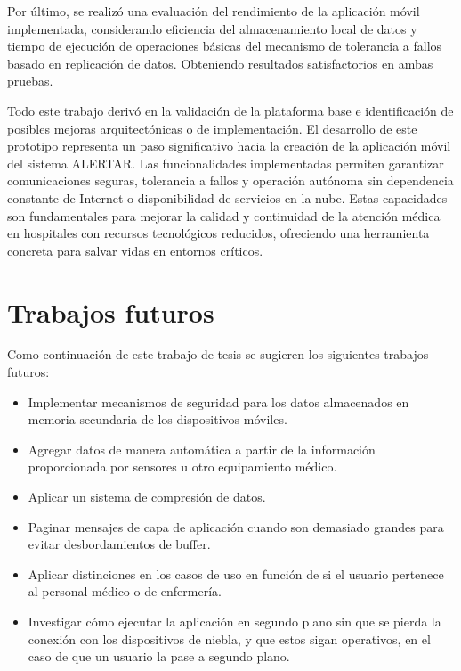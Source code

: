 Por último, se realizó una evaluación del rendimiento de la aplicación móvil implementada, considerando eficiencia del almacenamiento local de datos y tiempo de ejecución de operaciones básicas del mecanismo de tolerancia a fallos basado en replicación de datos. Obteniendo resultados satisfactorios en ambas pruebas. 



Todo este trabajo derivó en la validación de la plataforma base e identificación de posibles mejoras arquitectónicas o de implementación. El desarrollo de este prototipo representa un paso significativo hacia la creación de la aplicación móvil del sistema ALERTAR. Las funcionalidades implementadas permiten garantizar comunicaciones seguras, tolerancia a fallos y operación autónoma sin dependencia constante de Internet o disponibilidad de servicios en la nube. Estas capacidades son fundamentales para mejorar la calidad y continuidad de la atención médica en hospitales con recursos tecnológicos reducidos, ofreciendo una herramienta concreta para salvar vidas en entornos críticos.
\section{Trabajos futuros}

Como continuación de este trabajo de tesis se sugieren los siguientes trabajos futuros:
\begin{itemize}
    \item Implementar mecanismos de seguridad para los datos almacenados en memoria secundaria de los dispositivos móviles.
    \item Agregar datos de manera automática a partir de la información proporcionada por sensores u otro equipamiento médico.
    \item Aplicar un sistema de compresión de datos.
    \item Paginar mensajes de capa de aplicación cuando son demasiado grandes para evitar desbordamientos de buffer.
    \item Aplicar distinciones en los casos de uso en función de si el usuario pertenece al personal médico o de enfermería.
    \item Investigar cómo ejecutar la aplicación en segundo plano sin que se pierda la conexión con
    los dispositivos de niebla, y que estos sigan operativos, en el caso de que un usuario la pase a segundo plano.
\end{itemize}


